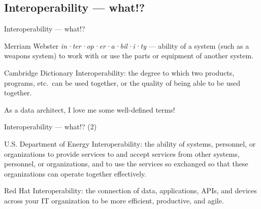 \subsection{Interoperability — what!?}\label{subsec:Definitions}
\begin{frame}{Interoperability — what!?}
  \begin{definition}{Merriam Webster}
    \small \textit{in·ter·op·er·a·bil·i·ty} — ability of a system (such as a weapons system) to work with or use the parts or equipment of another system.
  \end{definition}

  \begin{definition}{Cambridge Dictionary}
    \small Interoperability: the degree to which two products, programs, etc.\ can be used together, or the quality of being able to be used together.
  \end{definition}

  \vspace{0.3cm}
  \begin{center}
    {\large As a data architect, I love me some well-defined terms!}
  \end{center}
\end{frame}

\begin{frame}{Interoperability — what!? (2)}
  \begin{definition}{U.S. Department of Energy}
    \small Interoperability: the ability of systems, personnel, or organizations to provide services to and accept services from other systems, personnel, or organizations, and to use the services so exchanged so that these organizations can operate together effectively.
  \end{definition}

  \vspace{0.3cm}
  \begin{definition}{Red Hat}
    \small Interoperability: the connection of data, applications, APIs, and devices across your IT organization to be more efficient, productive, and agile.
  \end{definition}
\end{frame}

